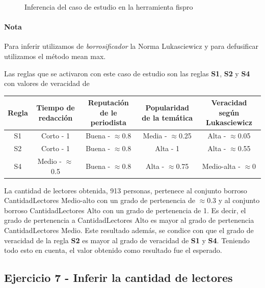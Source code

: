 \documentclass{article}
\begin{document}
\begin{itemize}
\begin{figure}[H]
	\centering
	\caption{Inferencia del caso de estudio en la herramienta fispro}
\end{figure}

\paragraph{Nota} Para inferir utilizamos de \textit{borrosificador} la Norma Lukasciewicz
y para defusificar utilizamos el método mean max.

\vspace{3mm}
Las reglas que se activaron con este caso de estudio son las reglas \textbf{S1}, \textbf{S2} y \textbf{S4} con valores de veracidad de

\begin{table}[H]
	\centering
	\begin{tabular}{c|c c c|c}
		Regla&Tiempo de redacción&Reputación de le periodista&Popularidad de la temática&Veracidad según Lukasciewicz\\
		\hline
		S1&Corto - 1&Buena - $\approx$0.8&Media - $\approx$0.25&Alta - $\approx$0.05\footnotemark\\
		S2&Corto - 1&Buena - $\approx$0.8&Alta - 1&Alta - $\approx$0.55\footnotemark\\
		S4&Medio - $\approx$0.5&Buena - $\approx$0.8&Alta - $\approx$0.75&Medio-alta - $\approx$0\footnotemark\\
	\end{tabular}
\end{table}


La cantidad de lectores obtenida, 913 personas, pertenece al conjunto borroso CantidadLectores Medio-alto con un grado de pertenencia de $\approx$0.3 y al conjunto borroso CantidadLectores Alto con un grado de pertenencia de 1. Es decir, el grado de pertenencia a CantidadLectores Alto es mayor al grado de pertenencia CantidadLectores Medio. Este resultado además, se condice con que el grado de veracidad de la regla \textbf{S2} es mayor al grado de veracidad de \textbf{S1} y \textbf{S4}. Teniendo todo esto en cuenta, el valor obtenido como resultado fue el esperado.

\pagebreak
\subsection*{Ejercicio 7 - Inferir la cantidad de lectores}


\end{itemize}
\end{document}
